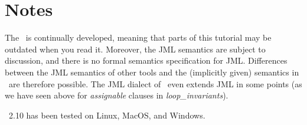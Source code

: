 \section{Notes}

The \kt\ is continually developed, meaning that parts of this
tutorial may be outdated when you read it. Moreover, the JML semantics
are subject to discussion, and there is no formal semantics
specification for JML. Differences between the JML semantics of other
tools and the (implicitly given) semantics in \KeY\ are therefore
possible. The JML dialect of \KeY\ even extends JML in some points (as
we have seen above for \textit{assignable} clauses in
\textit{loop\_invariants}).

\KeY\ 2.10 has been tested on Linux, MacOS, and Windows.

